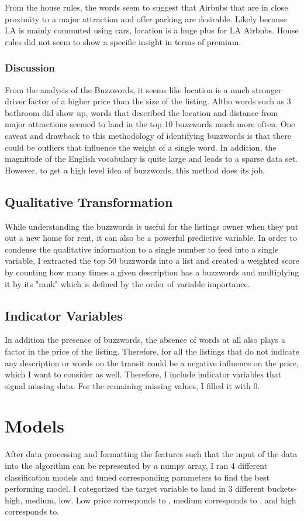 \documentclass[twocolumn,10pt]{asme2ej}
\begin{document}
From the house rules, the words seem to suggest that Airbnbs that are in close proximity to a major attraction and offer parking are desirable. Likely because LA is mainly commuted using cars, location is a huge plus for LA Airbnbs. House rules did not seem to show a specific insight in terms of premium.

\subsubsection{Discussion}
From the analysis of the Buzzwords, it seems like location is a much stronger driver factor of a higher price than the size of the listing. Altho words such as 3 bathroom did show up, words that described the location and distance from major attractions seemed to land in the top 10 buzzwords much more often. One caveat and drawback to this methodology of identifying buzzwords is that there could be outliers that influence the weight of a single word. In addition, the magnitude of the English vocabulary is quite large and leads to a sparse data set. However, to get a high level idea of buzzwords, this method does its job.
\subsection{Qualitative Transformation}
While understanding the buzzwords is useful for the listings owner when they put out a new home for rent, it can also be a powerful predictive variable. In order to condense the qualitative information to a single number to feed into a single variable, I extracted the top 50 buzzwords into a list and created a weighted score by counting how many times a given description has a buzzwords and multiplying it by its "rank" which is defined by the order of variable importance.
\subsection{Indicator Variables}
In addition the presence of buzzwords, the absence of words at all also plays a factor in the price of the listing. Therefore, for all the listings that do not indicate any description or words on the transit could be a negative influence on the price, which I want to consider as well. Therefore, I include indicator variables that signal missing data. For the remaining missing values, I filled it with 0.
\section{Models}
After data processing and formatting the features such that the input of the data into the algorithm can be represented by a numpy array, I ran 4 different classification models and tuned corresponding parameters to find the best performing model. I categorized the target variable to land in 3 different buckets- high, medium, low. Low price corresponds to , medium corresponds to , and high corresponds to. 
\end{document}

